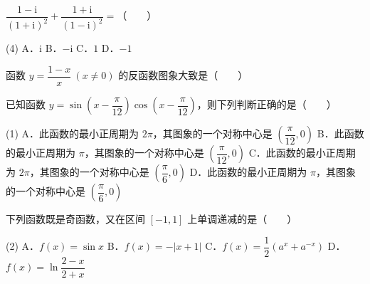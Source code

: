

\begin{question}
$\dfrac{1-\mathrm{i}}{(1+\mathrm{i})^2} + \dfrac{1+\mathrm{i}}{(1-\mathrm{i})^2} =$\mbox{（　　）}

\begin{gkopts}(4)
\task A．$\mathrm{i}$
\task B．$-\mathrm{i}$
\task C．$1$
\task D．$-1$
\end{gkopts}

\Needspace{0.4\textheight}
\end{question}
\begin{question}
函数 $y = \dfrac{1-x}{x}\ (x \neq 0)$ 的反函数图象大致是\mbox{（　　）}
\nopagebreak[4]
\begin{center}\end{center}
\nopagebreak[4]
\end{question}
\begin{question}
已知函数 $y = \sin\left(x - \dfrac{\pi}{12}\right)\cos\left(x - \dfrac{\pi}{12}\right)$，则下列判断正确的是\mbox{（　　）}

\begin{gkopts}(1)
\task A．此函数的最小正周期为 $2\pi$，其图象的一个对称中心是 $\left(\dfrac{\pi}{12}, 0\right)$
\task B．此函数的最小正周期为 $\pi$，其图象的一个对称中心是 $\left(\dfrac{\pi}{12}, 0\right)$
\task C．此函数的最小正周期为 $2\pi$，其图象的一个对称中心是 $\left(\dfrac{\pi}{6}, 0\right)$
\task D．此函数的最小正周期为 $\pi$，其图象的一个对称中心是 $\left(\dfrac{\pi}{6}, 0\right)$
\end{gkopts}

\end{question}
\begin{question}
下列函数既是奇函数，又在区间 $[-1, 1]$ 上单调递减的是\mbox{（　　）}

\begin{gkopts}(2)
\task A．$f(x) = \sin x$
\task B．$f(x) = -|x + 1|$
\task C．$f(x) = \dfrac{1}{2}(a^x + a^{-x})$
\task D．$f(x) = \ln \dfrac{2-x}{2+x}$
\end{gkopts}

\end{question}
